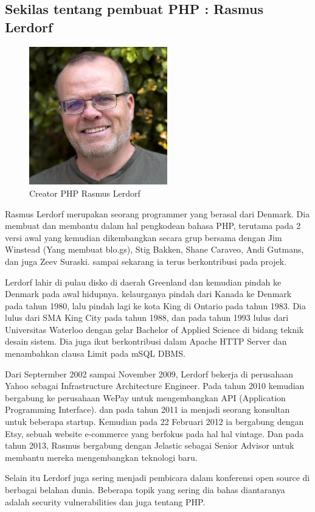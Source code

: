 \subsection{Sekilas tentang pembuat PHP : Rasmus Lerdorf}
	\begin{figure}[H]
		\includegraphics[width=6cm]{figures/web/rasmuslerdorf.jpg}
		\centering
		\caption{Creator PHP Rasmus Lerdorf }
	\end{figure}
Rasmus Lerdorf merupakan seorang programmer yang berasal dari Denmark. Dia membuat dan membantu dalam hal pengkodean bahasa PHP, terutama pada 2 versi awal yang kemudian dikembangkan secara grup bersama dengan Jim Winstead (Yang membuat blo.gs), Stig Bakken, Shane Caraveo, Andi Gutmans, dan juga Zeev Suraski. sampai sekarang ia terus berkontribusi pada projek.

Lerdorf lahir di pulau disko di daerah Greenland dan kemudian pindah ke Denmark pada awal hidupnya. kelaurganya pindah dari Kanada ke Denmark pada tahun 1980, lalu pindah lagi ke kota King di Ontario pada tahun 1983. Dia lulus dari SMA King City pada tahun 1988, dan pada tahun 1993 lulus dari Universitas Waterloo dengan gelar  Bachelor of Applied Science di bidang teknik desain sistem. Dia juga ikut berkontribusi dalam Apache HTTP Server dan menambahkan clausa Limit pada mSQL DBMS. 

Dari Septermber 2002 sampai November 2009, Lerdorf bekerja di perusahaan Yahoo sebagai Infrastructure Architecture Engineer. Pada tahun 2010 kemudian bergabung ke perusahaan WePay untuk mengembangkan API (Application Programming Interface). dan pada tahun 2011 ia menjadi seorang konsultan untuk beberapa startup. Kemudian pada 22 Februari 2012 ia bergabung dengan Etsy, sebuah website e-commerce yang berfokus pada hal hal vintage. Dan pada tahun 2013, Rasmus bergabung dengan Jelastic sebagai Senior Advisor untuk membantu mereka mengembangkan teknologi baru.

Selain itu Lerdorf juga sering menjadi pembicara dalam konferensi open source di berbagai belahan dunia. Beberapa topik yang sering dia bahas diantaranya adalah security vulnerabilities dan juga tentang PHP.

